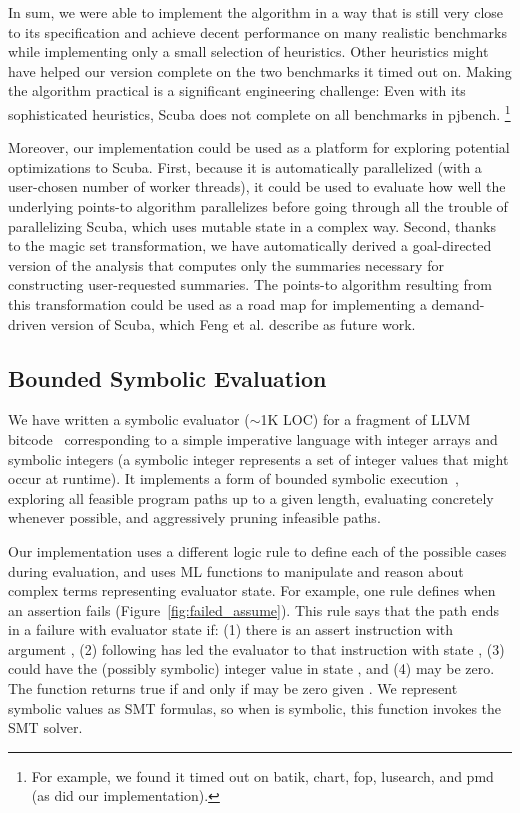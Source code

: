 \documentclass[acmsmall,screen,nonacm]{acmart}
\theoremstyle{definition}
\begin{document}
In sum, we were able to implement the algorithm in a way that is still very
close to its specification and achieve decent performance on many realistic
benchmarks while implementing only a small selection of heuristics.
Other heuristics might have helped our version complete on the two benchmarks
it timed out on.
Making the algorithm practical is a significant engineering challenge: Even
with its sophisticated heuristics, Scuba does not complete on all benchmarks in
pjbench.%
\footnote{For example, we found it timed out on batik, chart, fop, lusearch,
and pmd (as did our implementation).}

Moreover, our implementation could be used as a platform for exploring
potential optimizations to Scuba.
First, because it is automatically parallelized (with a user-chosen number of
worker threads), it could be used to evaluate how well the underlying points-to
algorithm parallelizes before going through all the trouble of parallelizing
Scuba, which uses mutable state in a complex way.
Second, thanks to the magic set transformation, we have automatically derived a
goal-directed version of the analysis that computes only the summaries
necessary for constructing user-requested summaries.
The points-to algorithm resulting from this transformation could be used as a
road map for implementing a demand-driven version of Scuba, which Feng et al.
describe as future work.

\subsection{Bounded Symbolic Evaluation}
\label{sec:symexec}

We have written a symbolic evaluator ($\sim$1K LOC) for a fragment of LLVM
bitcode~\citep{llvm} corresponding to a simple imperative language with
integer arrays and symbolic integers (a symbolic integer represents a set of
integer values that might occur at runtime).
It implements a form of bounded symbolic execution~\citep{king}, exploring all
feasible program paths up to a given length, evaluating concretely whenever
possible, and aggressively pruning infeasible paths.

Our implementation uses a different logic rule to define each of the possible
cases during evaluation, and uses ML functions to manipulate and reason about
complex terms representing evaluator state.
For example, one rule defines when an assertion fails
(Figure~\ref{fig:failed_assume}).
This rule says that the path  ends in a failure with evaluator state
 if: (1) there is an assert instruction  with argument ,
(2) following  has led the evaluator to that instruction with state
, (3)  could have the (possibly symbolic) integer value  in state ,
and (4)  may be zero.
The function  returns true if and only if  may
be zero given .
We represent symbolic values as SMT formulas, so when  is symbolic, this
function invokes the SMT solver.
\end{document}
